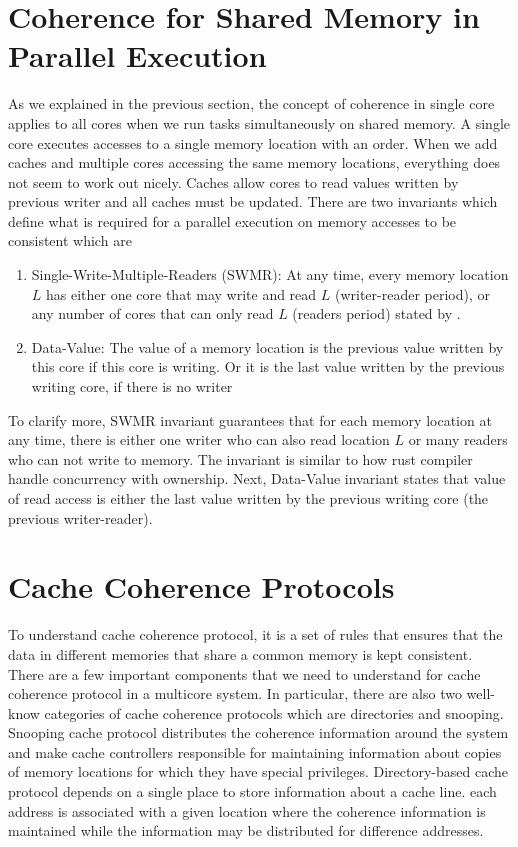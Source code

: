 \section{Coherence for Shared Memory in Parallel Execution}
As we explained in the previous section, the concept of coherence in single core applies to all cores when we run tasks
simultaneously on shared memory. A single core executes accesses to a single memory location with an order. When we add caches and multiple cores accessing the same memory locations,
everything does not seem to work out nicely. Caches allow cores to read values written by previous writer and all caches must be updated.
There are two invariants which define what is required for a parallel execution on memory accesses to be consistent which are 
\begin{enumerate}
        \item Single-Write-Multiple-Readers (SWMR): At any time, every memory location $L$  has either one core that may write and read $L$ (writer-reader period), or any number of cores that can only read $L$ (readers period) stated by \cite{hay2012mesif}.
        \item Data-Value: The value of a memory location is the previous value written by this core if this core is writing. Or it is the last value written by the previous writing core, 
                if there is no writer
\end{enumerate}
To clarify more, SWMR invariant guarantees that for each memory location at any time, there is either one writer who can also read location $L$ or many readers who can not write to memory.
The invariant is similar to how rust compiler handle concurrency with ownership. Next, Data-Value invariant states that value of read access
is either the last value written by the previous writing core (the previous writer-reader).

\section{Cache Coherence Protocols}
To understand cache coherence protocol, it is a set of rules that ensures that the data in different memories that share a common memory is kept consistent.
There are a few important components that we need to understand for cache coherence protocol in a multicore system. In particular, there are also two well-know categories of cache coherence protocols which are directories and snooping.
Snooping cache protocol distributes the coherence information around the system and make cache controllers responsible for maintaining information about copies of memory locations for which they have special privileges.
Directory-based cache protocol depends on a single place to store information about a cache line. each address is associated with a given location where the coherence information is maintained while the information may be distributed for difference addresses.

